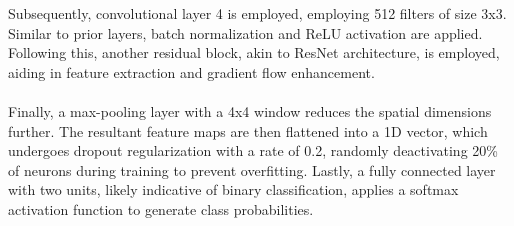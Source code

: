 		Subsequently, convolutional layer 4 is employed, employing 512 filters of size 3x3. Similar to prior layers, batch normalization and ReLU activation are applied. Following this, another residual block, akin to ResNet architecture, is employed, aiding in feature extraction and gradient flow enhancement.\\\\
		Finally, a max-pooling layer with a 4x4 window reduces the spatial dimensions further. The resultant feature maps are then flattened into a 1D vector, which undergoes dropout regularization with a rate of 0.2, randomly deactivating 20\% of neurons during training to prevent overfitting. Lastly, a fully connected layer with two units, likely indicative of binary classification, applies a softmax activation function to generate class probabilities.
	\newpage
	\begin{figure}[hbt!]
	\end{figure}

